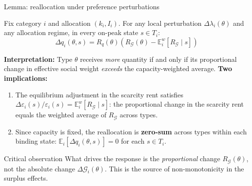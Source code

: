 \documentclass[10pt, aspectratio=169]{beamer}
\newcommand{\E}{\mathbb{E}}
\newcommand{\G}{\mathcal{G}}
\begin{document}
\begin{frame}{Lemma: reallocation under preference perturbations}
\begin{lemma}
Fix category $i$ and allocation $(k_i, I_i)$. For any local perturbation $\Delta\lambda_i(\theta)$ and any allocation regime, in every on-peak state $s \in T_i$:
\[ \Delta q_i(\theta,s) = R_q(\theta)\!\left(R_\G(\theta) - \E_i^w\!\left[R_\G \mid s\right]\right) \]
\end{lemma}
\vspace{0.2cm}
\textbf{Interpretation:} Type $\theta$ receives \emph{more} quantity if and only if its proportional change in effective social weight \emph{exceeds} the capacity-weighted average.
\vspace{0.2cm}
\textbf{Two implications:}
\begin{enumerate}
\item The equilibrium adjustment in the scarcity rent satisfies $\Delta\varepsilon_i(s)/\varepsilon_i(s) = \E_i^w[R_\G \mid s]$: the proportional change in the scarcity rent equals the weighted average of $R_\G$ across types.
\item Since capacity is fixed, the reallocation is \textbf{zero-sum} across types within each binding state: $\E_i[\Delta q_i(\theta,s)] = 0$ for each $s \in T_i$.
\end{enumerate}
\vspace{0.2cm}
\begin{alertblock}{Critical observation}
What drives the response is the \emph{proportional} change $R_\G(\theta)$, not the absolute change $\Delta\G_i(\theta)$. This is the source of non-monotonicity in the surplus effects.
\end{alertblock}
\end{frame}
\end{document}
